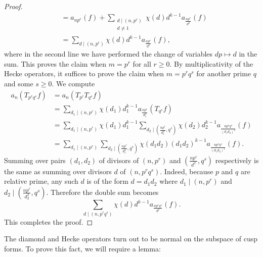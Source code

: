 \begin{proof}
\begin{align*}
        &= a_{np^{r}}(f)+\sum_{\substack{d \mid (n,p^{r}) \\ d \neq 1}}\chi(d)d^{k-1}a_{\frac{np^{r}}{d^{2}}}(f) \\
        &= \sum_{d \mid (n,p^{r})}\chi(d)d^{k-1}a_{\frac{np^{r}}{d^{2}}}(f),
      \end{align*}
      where in the second line we have performed the change of variables $dp \mapsto d$ in the sum. This proves the claim when $m = p^{r}$ for all $r \ge 0$. By multiplicativity of the Hecke operators, it suffices to prove the claim when $m = p^{r}q^{s}$ for another prime $q$ and some $s \ge 0$. We compute
      \begin{align*}
        a_{n}(T_{p^{r}q^{s}}f) &= a_{n}(T_{p^{r}}T_{q^{s}}f) \\
        &= \sum_{d_{1} \mid (n,p^{r})}\chi(d_{1})d_{1}^{k-1}a_{\frac{np^{r}}{d_{1}^{2}}}(T_{q^{s}}f) \\
        &= \sum_{d_{1} \mid (n,p^{r})}\chi(d_{1})d_{1}^{k-1}\sum_{d_{2} \mid \left(\frac{np^{r}}{d_{1}^{2}},q^{s}\right)}\chi(d_{2})d_{2}^{k-1}a_{\frac{np^{r}q^{s}}{(d_{1}d_{2})^{2}}}(f) \\
        &= \sum_{d_{1} \mid (n,p^{r})}\sum_{d_{2} \mid \left(\frac{np^{r}}{d_{1}^{2}},q^{s}\right)}\chi(d_{1}d_{2})(d_{1}d_{2})^{k-1}a_{\frac{np^{r}q^{s}}{(d_{1}d_{2})^{2}}}(f).
      \end{align*}
      Summing over pairs $(d_{1},d_{2})$ of divisors of $(n,p^{r})$ and $\left(\frac{np^{r}}{d^{2}},q^{s}\right)$ respectively is the same as summing over divisors $d$ of $(n,p^{r}q^{s})$. Indeed, because $p$ and $q$ are relative prime, any such $d$ is of the form $d = d_{1}d_{2}$ where $d_{1} \mid (n,p^{r})$ and $d_{2} \mid \left(\frac{np^{r}}{d_{2}^{2}},q^{s}\right)$. Therefore the double sum becomes
      \[
        \sum_{d \mid (n,p^{r}q^{s})}\chi(d)d^{k-1}a_{\frac{np^{r}q^{s}}{d^{2}}}(f).
      \]
      This completes the proof.
    \end{proof}

    The diamond and Hecke operators turn out to be normal on the subspace of cusp forms. To prove this fact, we will require a lemma:

